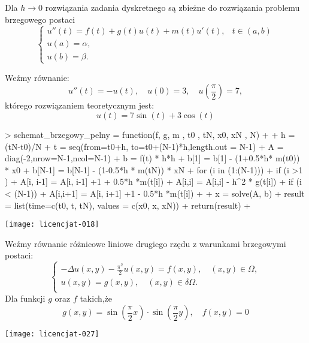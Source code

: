 \documentclass[notheorems]{beamer}
\begin{document}
\begin{frame}
\begin{theorem}
Dla $h \to 0$ rozwiązania zadania dyskretnego są zbieżne do rozwiązania problemu brzegowego postaci
\begin{equation}\label{zagad_brzeg_zbiez}
\left\{\begin{array}{cl}
u''(t) = f(t) + g(t) u(t) + m(t) u'(t), &  t \in (a,b)\\
u(a) = \alpha, & \\
u(b) = \beta.
\end{array}\right.
\end{equation}
\end{theorem}
\end{frame}
\begin{frame}
\begin{example}
Weźmy równanie:
$$
u''(t)= -u(t), \quad u(0)=3, \quad u(\frac{\pi}{2}) = 7,
$$
którego rozwiązaniem teoretycznym jest:
$$
u(t) = 7\sin(t) + 3\cos(t)
$$
\end{example}
\end{frame}
\begin{frame}[fragile]
\begin{small}
\begin{Schunk}
\begin{Sinput}
> schemat_brzegowy_pelny = function(f, g, m , t0 , tN, x0, xN , N)
+ {
+   h = (tN-t0)/N
+   t = seq(from=t0+h, to=t0+(N-1)*h,length.out = N-1)
+   A = diag(-2,nrow=N-1,ncol=N-1)
+   b = f(t) * h*h
+   b[1] = b[1] - (1+0.5*h* m(t0)) * x0
+   b[N-1] = b[N-1] - (1-0.5*h * m(tN)) * xN
+   for (i in (1:(N-1))){
+     if (i >1 )
+       A[i, i-1] = A[i, i-1] +1 + 0.5*h *m(t[i])
+     A[i,i] = A[i,i] - h^2 * g(t[i])
+     if (i < (N-1))
+       A[i,i+1] =  A[i, i+1] +1 - 0.5*h *m(t[i])
+   }
+   x = solve(A, b)
+   result = list(time=c(t0, t, tN), values = c(x0, x, xN))
+   return(result)
+ }
\end{Sinput}
\end{Schunk}
\end{small}
\end{frame}
\begin{frame}
\texttt{[image: licencjat-018]}
\end{frame}
\begin{frame}
\begin{problem}
Weźmy równanie różnicowe liniowe drugiego rzędu z warunkami brzegowymi postaci:
$$
\left\lbrace
\begin{array}{c}
-\Delta u(x,y) - \frac{\pi^2}{2}u(x,y) = f(x,y), \quad (x,y) \in \Omega, \\
u(x,y) = g(x,y), \quad (x,y) \in \delta \Omega.\\
\end{array}
\right.
$$
Dla funkcji $g$ oraz $f$ takich,że
$$
g(x,y) = \sin(\frac{\pi}{2}x) \cdot \sin(\frac{\pi}{2}y), \quad f(x,y)=0
$$
\end{problem}
\end{frame}
\begin{frame}
\texttt{[image: licencjat-027]}
\end{frame}
\end{document}
